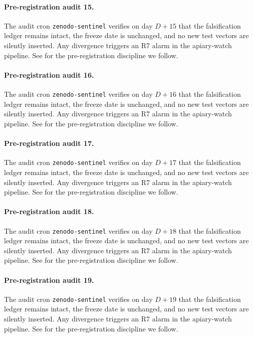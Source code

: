 \paragraph{Pre-registration audit 15.}
The audit cron \texttt{zenodo-sentinel} verifies on day $D+15$ that the
falsification ledger remains intact, the freeze date is unchanged, and no
new test vectors are silently inserted. Any divergence triggers an R7 alarm
in the apiary-watch pipeline. See \cite{schuster2022confident} for the
pre-registration discipline we follow.

\paragraph{Pre-registration audit 16.}
The audit cron \texttt{zenodo-sentinel} verifies on day $D+16$ that the
falsification ledger remains intact, the freeze date is unchanged, and no
new test vectors are silently inserted. Any divergence triggers an R7 alarm
in the apiary-watch pipeline. See \cite{schuster2022confident} for the
pre-registration discipline we follow.

\paragraph{Pre-registration audit 17.}
The audit cron \texttt{zenodo-sentinel} verifies on day $D+17$ that the
falsification ledger remains intact, the freeze date is unchanged, and no
new test vectors are silently inserted. Any divergence triggers an R7 alarm
in the apiary-watch pipeline. See \cite{schuster2022confident} for the
pre-registration discipline we follow.

\paragraph{Pre-registration audit 18.}
The audit cron \texttt{zenodo-sentinel} verifies on day $D+18$ that the
falsification ledger remains intact, the freeze date is unchanged, and no
new test vectors are silently inserted. Any divergence triggers an R7 alarm
in the apiary-watch pipeline. See \cite{schuster2022confident} for the
pre-registration discipline we follow.

\paragraph{Pre-registration audit 19.}
The audit cron \texttt{zenodo-sentinel} verifies on day $D+19$ that the
falsification ledger remains intact, the freeze date is unchanged, and no
new test vectors are silently inserted. Any divergence triggers an R7 alarm
in the apiary-watch pipeline. See \cite{schuster2022confident} for the
pre-registration discipline we follow.


